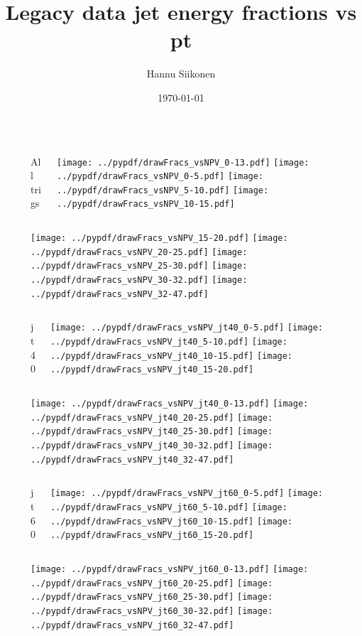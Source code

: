 \documentclass[aspectratio=169]{beamer}
\title[Legacy data jet energy fractions vs pt]{Legacy data jet energy fractions vs pt}
\author{Hannu Siikonen}
\institute{Helsinki Institute of Physics \\ \vspace{0.25cm} Instructor Adj.~Prof.~Mikko~Voutilainen}
\date{\today}
\begin{document}
\titlepage

\newpage

\begin{figure}[p]
\flushleft
\begin{columns}[T]
\begin{column}{.2\linewidth}
\centering
All trigs
\end{column}
\begin{column}{.8\linewidth}
\texttt{[image: ../pypdf/drawFracs\_vsNPV\_0-13.pdf]}
\texttt{[image: ../pypdf/drawFracs\_vsNPV\_0-5.pdf]}
\texttt{[image: ../pypdf/drawFracs\_vsNPV\_5-10.pdf]}
\texttt{[image: ../pypdf/drawFracs\_vsNPV\_10-15.pdf]}
\end{column}
\end{columns}
\texttt{[image: ../pypdf/drawFracs\_vsNPV\_15-20.pdf]}
\texttt{[image: ../pypdf/drawFracs\_vsNPV\_20-25.pdf]}
\texttt{[image: ../pypdf/drawFracs\_vsNPV\_25-30.pdf]}
\texttt{[image: ../pypdf/drawFracs\_vsNPV\_30-32.pdf]}
\texttt{[image: ../pypdf/drawFracs\_vsNPV\_32-47.pdf]}
\end{figure}

\begin{figure}[p]
\flushleft
\begin{columns}[T]
\begin{column}{.2\linewidth}
\centering
jt40
\end{column}
\begin{column}{.8\linewidth}
\texttt{[image: ../pypdf/drawFracs\_vsNPV\_jt40\_0-5.pdf]}
\texttt{[image: ../pypdf/drawFracs\_vsNPV\_jt40\_5-10.pdf]}
\texttt{[image: ../pypdf/drawFracs\_vsNPV\_jt40\_10-15.pdf]}
\texttt{[image: ../pypdf/drawFracs\_vsNPV\_jt40\_15-20.pdf]}
\end{column}
\end{columns}
\texttt{[image: ../pypdf/drawFracs\_vsNPV\_jt40\_0-13.pdf]}
\texttt{[image: ../pypdf/drawFracs\_vsNPV\_jt40\_20-25.pdf]}
\texttt{[image: ../pypdf/drawFracs\_vsNPV\_jt40\_25-30.pdf]}
\texttt{[image: ../pypdf/drawFracs\_vsNPV\_jt40\_30-32.pdf]}
\texttt{[image: ../pypdf/drawFracs\_vsNPV\_jt40\_32-47.pdf]}
\end{figure}

\begin{figure}[p]
\flushleft
\begin{columns}[T]
\begin{column}{.2\linewidth}
\centering
jt60
\end{column}
\begin{column}{.8\linewidth}
\texttt{[image: ../pypdf/drawFracs\_vsNPV\_jt60\_0-5.pdf]}
\texttt{[image: ../pypdf/drawFracs\_vsNPV\_jt60\_5-10.pdf]}
\texttt{[image: ../pypdf/drawFracs\_vsNPV\_jt60\_10-15.pdf]}
\texttt{[image: ../pypdf/drawFracs\_vsNPV\_jt60\_15-20.pdf]}
\end{column}
\end{columns}
\texttt{[image: ../pypdf/drawFracs\_vsNPV\_jt60\_0-13.pdf]}
\texttt{[image: ../pypdf/drawFracs\_vsNPV\_jt60\_20-25.pdf]}
\texttt{[image: ../pypdf/drawFracs\_vsNPV\_jt60\_25-30.pdf]}
\texttt{[image: ../pypdf/drawFracs\_vsNPV\_jt60\_30-32.pdf]}
\texttt{[image: ../pypdf/drawFracs\_vsNPV\_jt60\_32-47.pdf]}
\end{figure}
\end{document}
